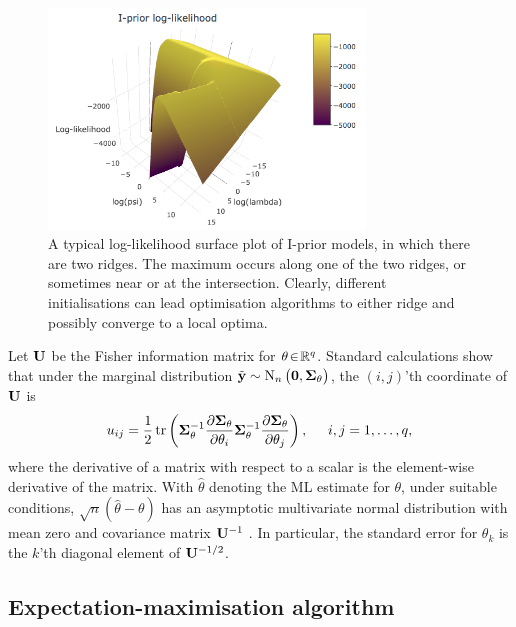 \begin{figure}[hbt]
  \centering
  \includegraphics[width=0.75\textwidth]{figure/04-iprior-ridge-2}
  \caption[A typical log-likelihood surface plot of I-prior models.]{A typical log-likelihood surface plot of I-prior models, in which there are two ridges. The maximum occurs along one of the two ridges, or sometimes near or at the intersection. Clearly, different initialisations can lead optimisation algorithms to either ridge and possibly converge to a local optima.}
  \label{fig:ipriorridge}
\end{figure}

Let ${\mathbf U}$ be the Fisher information matrix for $\theta \!\in\!\mathbb{R}^q$.
Standard calculations  show that under the marginal distribution $\tilde{{\mathbf y}} \sim \operatorname{N}_n\big({\mathbf 0}, {\bm\Sigma}_\theta \big)$, the $(i,j)$'th coordinate of ${\mathbf U}$ is 
\begin{equation}
  u_{ij} = 
  \frac{1}{2} \operatorname{tr}\left(
  {\bm\Sigma}_\theta^{-1} \frac{\partial{\bm\Sigma}_\theta}{\partial\theta_i}
  {\bm\Sigma}_\theta^{-1} \frac{\partial{\bm\Sigma}_\theta}{\partial\theta_j} 
  \right), \hspace{0.5cm}i,j=1,\dots,q,
\end{equation}
where the derivative of a matrix with respect to a scalar is the element-wise derivative of the matrix.
With $\hat\theta$ denoting the ML estimate for $\theta$, under suitable conditions, $\surd n (\hat\theta - \theta)$ has an asymptotic multivariate normal distribution with mean zero and covariance matrix ${\mathbf U}^{-1}$ \citep{casella2002statistical}.
In particular, the standard error for $\theta_k$ is the $k$'th diagonal element of ${\mathbf U}^{-1/2}$.

\subsection{Expectation-maximisation algorithm}
\label{sec:emiprior}

